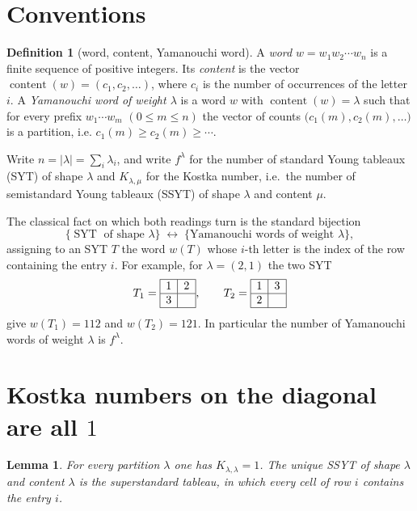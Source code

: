 \documentclass[11pt]{article}
\newtheorem{lemma}[theorem]{Lemma}
\theoremstyle{definition}
\newtheorem{definition}[theorem]{Definition}
\theoremstyle{remark}
\DeclareMathOperator{\cont}{content}
\DeclareMathOperator{\SYT}{SYT}
\begin{document}
\section{Conventions}

\begin{definition}[word, content, Yamanouchi word]
A \emph{word} $w=w_1w_2\cdots w_n$ is a finite sequence of positive integers.
Its \emph{content} is the vector $\cont(w)=(c_1,c_2,\dots)$, where $c_i$ is the
number of occurrences of the letter $i$. A \emph{Yamanouchi word of weight
$\lambda$} is a word $w$ with $\cont(w)=\lambda$ such that for every prefix
$w_1\cdots w_m$ $(0\le m\le n)$ the vector of counts
$\bigl(c_1(m),c_2(m),\dots\bigr)$ is a partition, i.e.
$c_1(m)\ge c_2(m)\ge\cdots$.
\end{definition}

Write $n=|\lambda|=\sum_i\lambda_i$, and write $f^\lambda$ for the number of
standard Young tableaux (SYT) of shape $\lambda$ and $K_{\lambda,\mu}$ for the
Kostka number, i.e.\ the number of semistandard Young tableaux (SSYT) of shape
$\lambda$ and content $\mu$.

The classical fact on which both readings turn is the standard bijection
\[
\bigl\{\SYT\text{ of shape }\lambda\bigr\}
\;\longleftrightarrow\;
\bigl\{\text{Yamanouchi words of weight }\lambda\bigr\},
\]
assigning to an SYT $T$ the word $w(T)$ whose $i$-th letter is the index of the
row containing the entry $i$. For example, for $\lambda=(2,1)$ the two SYT
\[
T_1=\begin{array}{|c|c|}\hline 1&2\\\hline 3&\phantom{x}\\\hline\end{array},
\qquad
T_2=\begin{array}{|c|c|}\hline 1&3\\\hline 2&\phantom{x}\\\hline\end{array}
\]
give $w(T_1)=112$ and $w(T_2)=121$. In particular the number of Yamanouchi
words of weight $\lambda$ is $f^\lambda$.

\section{Kostka numbers on the diagonal are all $1$}

\begin{lemma}\label{lem:Kdiag}
For every partition $\lambda$ one has $K_{\lambda,\lambda}=1$. The unique SSYT
of shape $\lambda$ and content $\lambda$ is the \emph{superstandard} tableau,
in which every cell of row $i$ contains the entry $i$.
\end{lemma}
\end{document}
